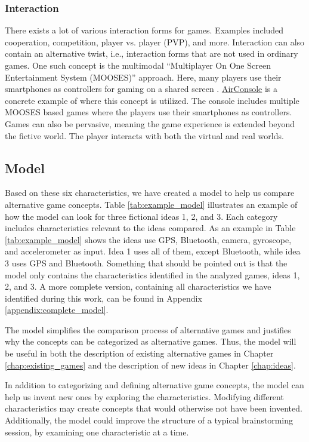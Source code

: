 \documentclass[../Main.tex]{subfiles}
\begin{document}
\subsubsection{Interaction}
There exists a lot of various interaction forms for games. Examples included cooperation, competition, player vs. player (PVP), and more. Interaction can also contain an alternative twist, i.e., interaction forms that are not used in ordinary games. One such concept is the multimodal “Multiplayer On One Screen Entertainment System (MOOSES)” approach. Here, many players use their smartphones as controllers for gaming on a shared screen \citep{wang_evaluation_2010}. \href{http://www.airconsole.com}{AirConsole} is a concrete example of where this concept is utilized. The console includes multiple MOOSES based games where the players use their smartphones as controllers. Games can also be pervasive, meaning the game experience is extended beyond the fictive world. The player interacts with both the virtual and real worlds.

\subsection{Model}
Based on these six characteristics, we have created a model to help us compare alternative game concepts. Table \ref{tab:example_model} illustrates an example of how the model can look for three fictional ideas 1, 2, and 3. Each category includes characteristics relevant to the ideas compared. As an example in Table \ref{tab:example_model} shows the ideas use GPS, Bluetooth, camera, gyroscope, and accelerometer as input. Idea 1 uses all of them, except Bluetooth, while idea 3 uses GPS and Bluetooth. Something that should be pointed out is that the model only contains the characteristics identified in the analyzed games, ideas 1, 2, and 3. A more complete version, containing all characteristics we have identified during this work, can be found in Appendix \ref{appendix:complete_model}.

The model simplifies the comparison process of alternative games and justifies why the concepts can be categorized as alternative games. Thus, the model will be useful in both the description of existing alternative games in Chapter \ref{chap:existing_games} and the description of new ideas in Chapter \ref{chap:ideas}.

In addition to categorizing and defining alternative game concepts, the model can help us invent new ones by exploring the characteristics. Modifying different characteristics may create concepts that would otherwise not have been invented. Additionally, the model could improve the structure of a typical brainstorming session, by examining one characteristic at a time.
\end{document}
